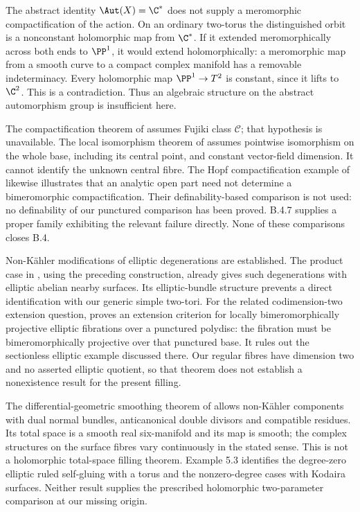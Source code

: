 \begin{remark}
The abstract identity $\Aut(X)=\C^*$ does not supply a
meromorphic compactification of the action. On an ordinary
two-torus the distinguished orbit is a nonconstant holomorphic
map from $\C^*$. If it extended meromorphically across both
ends to $\PP^1$, it would extend holomorphically: a
meromorphic map from a smooth curve to a compact complex
manifold has a removable indeterminacy. Every holomorphic
map $\PP^1\to T^2$ is constant, since it lifts to $\C^2$.
This is a contradiction. Thus an algebraic structure on the
abstract automorphism group is insufficient here.

The compactification theorem of
\citet[Theorem 1.2]{BiliottiGhigi2021Root} assumes Fujiki
class $\mathcal C$; that hypothesis is unavailable.
The local isomorphism theorem of
\citet[Theorem 3]{Meersseman2011Root} assumes pointwise
isomorphism on the whole base, including its central point,
and constant vector-field dimension. It cannot identify the
unknown central fibre. The Hopf compactification example of
\citet[Example 1]{KatzarkovEtAl2025Root} likewise illustrates
that an analytic open part need not determine a bimeromorphic
compactification. Their definability-based comparison is not
used: no definability of our punctured comparison has been
proved. B.4.7 supplies a proper family exhibiting the relevant
failure directly. None of these comparisons closes B.4.

Non-K\"ahler modifications of elliptic degenerations are
established. The product case in
\citet[Section 3, Example 3.4(1)]{Fujimoto1988Root}, using
the preceding construction, already gives such degenerations
with elliptic abelian nearby surfaces. Its elliptic-bundle
structure prevents a direct identification with our generic
simple two-tori. For the related codimension-two extension
question, \citet[Theorem 7.1.3]{Nakayama2002Root} proves an
extension criterion for locally bimeromorphically projective
elliptic fibrations over a punctured polydisc: the fibration
must be bimeromorphically projective over that punctured base.
It rules out the sectionless elliptic example discussed there.
Our regular fibres have dimension two and no asserted elliptic
quotient, so that theorem does not establish a nonexistence
result for the present filling.

The differential-geometric smoothing theorem of
\citet[Theorem 5.5, pp.~882--883]{Doi2009Root} allows
non-K\"ahler components with dual normal bundles,
anticanonical double divisors and compatible residues.
Its total space is a smooth real six-manifold and its
map is smooth; the complex structures on the surface
fibres vary continuously in the stated sense.
This is not a holomorphic total-space filling theorem.
Example 5.3 identifies the degree-zero elliptic ruled
self-gluing with a torus and the nonzero-degree cases
with Kodaira surfaces. Neither result supplies the
prescribed holomorphic two-parameter comparison at our
missing origin.
\end{remark}
